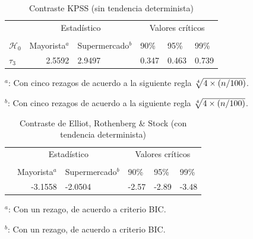 \documentclass[12pt, twoside]{book}\usepackage[]{graphicx}\usepackage[]{color}
\numberwithin{equation}{section}
\numberwithin{theorem}{section}
\numberwithin{teorema}{section}
\numberwithin{defi}{section}
\numberwithin{prop}{section}
\numberwithin{defi}{section}
\theoremstyle{plain}
\begin{document}
\begin{table}[H]
\centering
\begin{threeparttable}
\caption{Contraste KPSS (sin tendencia determinista)}
\begin{tabular}{@{}lrllll@{}}
\toprule
\multicolumn{1}{l}{} & \multicolumn{2}{c}{Estadístico} &
\multicolumn{3}{c}{Valores críticos} \\
\cmidrule(l){2-3} \cmidrule(l){4-6} \\
\multicolumn{1}{l}{$\mathcal{H}_0$} & \multicolumn{1}{c}{Mayorista$^{a}$} &
 \multicolumn{1}{c}{Supermercado$^{b}$} &
\multicolumn{1}{l}{90\%}&
\multicolumn{1}{l}{95\%}&
\multicolumn{1}{l}{99\%}
\\
\midrule
$\tau_{3} $  & 2.5592 &  2.9497 & 0.347 & 0.463 & 0.739 \\
\bottomrule
\end{tabular}
\label{tab-7}
\begin{tablenotes}
\small 
\item $^{a}$: Con cinco rezagos de acuerdo a la siguiente regla $\root 4 \of {4 \times (n/100)}$. 
\item $^{b}$: Con cinco rezagos de acuerdo a la siguiente regla $\root 4 \of {4 \times (n/100)}$. 
\end{tablenotes}
\end{threeparttable}
\end{table}





\begin{table}[H]
\centering
\begin{threeparttable}
\caption{Contraste de Elliot, Rothenberg \& Stock (con tendencia determinista)}
\begin{tabular}{@{}lrllll@{}}
\toprule
\multicolumn{1}{l}{} & \multicolumn{2}{c}{Estadístico} &
\multicolumn{3}{c}{Valores críticos} \\
\cmidrule(l){2-3} \cmidrule(l){4-6} \\
\multicolumn{1}{l}{} & \multicolumn{1}{c}{Mayorista$^{a}$} &
 \multicolumn{1}{c}{Supermercado$^{b}$} &
\multicolumn{1}{l}{90\%}&
\multicolumn{1}{l}{95\%}&
\multicolumn{1}{l}{99\%}
\\
\midrule
  & -3.1558 &  -2.0504 & -2.57 & -2.89 & -3.48 \\
\bottomrule
\end{tabular}
\label{tab-8}
\begin{tablenotes}
\small 
\item $^{a}$: Con un rezago, de acuerdo a criterio BIC. 
\item $^{b}$: Con un rezago, de acuerdo a criterio BIC. 
\end{tablenotes}
\end{threeparttable}
\end{table}
\end{document}
